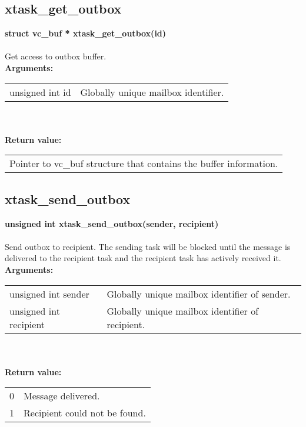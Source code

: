 \begin{samepage}
\subsection{xtask\_get\_outbox}
\noindent
\textbf{struct vc\_buf *  xtask\_get\_outbox(id)}\\\\
Get access to outbox buffer.\\

\noindent
\textbf{Arguments:}\\
\indent\begin{tabular}{ p{4.5cm}  p{9cm} }
unsigned int id          & Globally unique mailbox identifier.           
\end{tabular}\\\\

\noindent
\textbf{Return value:}\\
\indent\begin{tabular}{  p{13.5cm} }
Pointer to vc\_buf structure that contains the buffer information.
\end{tabular}
\end{samepage}

\begin{samepage}
\subsection{xtask\_send\_outbox}
\noindent
\textbf{unsigned int xtask\_send\_outbox(sender, recipient)}\\\\
Send outbox to recipient. The sending task will be blocked until the message
is delivered to the recipient task and the recipient task has actively received it.\\

\noindent
\textbf{Arguments:}\\
\indent\begin{tabular}{ p{4.5cm}  p{9cm} }
unsigned int sender    & Globally unique mailbox identifier of sender.\\
unsigned int recipient & Globally unique mailbox identifier of recipient.\\          
\end{tabular}\\\\

\noindent
\textbf{Return value:}\\
\indent\begin{tabular}{  p{4.5cm}  p{9cm} }
0 & Message delivered. \\
1 & Recipient could not be found. 
\end{tabular}
\end{samepage}

